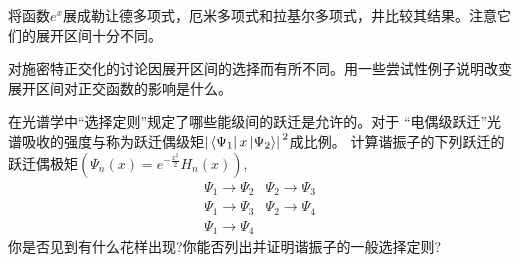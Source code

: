 \begin{problemset}
    \item 将函数$e^x$展成勒让德多项式，厄米多项式和拉基尔多项式，井比较其结果。注意它们的展开区间十分不同。
    \item 对施密特正交化的讨论因展开区间的选择而有所不同。用一些尝试性例子说明改变展开区间对正交函数的影响是什么。
    \item 在光谱学中“选择定则”规定了哪些能级间的跃迁是允许的。对于
    “电偶级跃迁”光谱吸收的强度与称为跃迁偶级矩$\abs*{\bra*{\Psi_1}x\ket*{\Psi_2}}^2$成比例。
    计算谐振子的下列跃迁的跃迁偶极矩$(\Psi_n(x)=e^{-\frac{x^2}{2}}H_n(x))$,
    \[
    \begin{array}{ll}
        \Psi_1 \rightarrow \Psi_2 & \Psi_2 \rightarrow \Psi_3 \\
        \Psi_1 \rightarrow \Psi_3 & \Psi_2 \rightarrow \Psi_4 \\
        \Psi_1 \rightarrow \Psi_4
    \end{array}    
    \]
    你是否见到有什么花样出现?你能否列出并证明谐振子的一般选择定则?
\end{problemset}